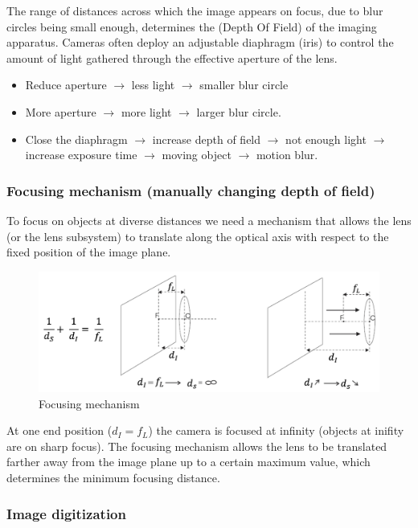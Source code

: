 The range of distances across which the image appears on focus, due to blur circles being small enough, determines the (Depth Of Field) of the imaging apparatus.
Cameras often deploy an adjustable diaphragm (iris) to control the amount of light gathered through the effective aperture of the lens.
\begin{itemize}
  \item Reduce aperture $\rightarrow$ less light $\rightarrow$ smaller blur circle
  \item More aperture $\rightarrow$ more light $\rightarrow$ larger blur circle.
  \item Close the diaphragm $\rightarrow$ increase depth of field $\rightarrow$ not enough light $\rightarrow$ increase exposure time $\rightarrow$ moving object $\rightarrow$ motion blur.
\end{itemize}

\subsubsection{Focusing mechanism (manually changing depth of field)}
To focus on objects at diverse distances we need a mechanism that allows the lens (or the lens subsystem) to translate along the optical axis with respect to the fixed position of the image plane.

\begin{figure}[htbp]
  \centering
  \includegraphics[width=0.7\linewidth]{./img/focusing_mechanism.jpg}
  \caption{Focusing mechanism}
  \label{fig:focusing_mechanism}
\end{figure}

At one end position ($d_I = f_L$) the camera is focused at infinity (objects at inifity are on sharp focus).
The focusing mechanism allows the lens to be translated farther away from the image plane up to a certain maximum value, which determines the minimum focusing distance.

\subsubsection{Image digitization}

